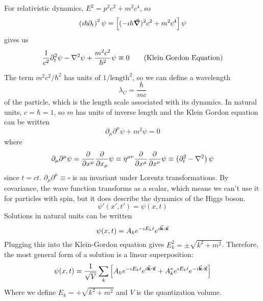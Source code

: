\documentclass[a4paper,twoside,master.tex]{subfiles}
\begin{document}
For relativistic dynamics, $ E^2 = p^2 c^2 + m^2 c^4 $, so
\begin{equation}
    \left( \imath \hbar \partial_t \right)^2 \psi = \left[ (- \imath \hbar \grad)^2 c^2 + m^2 c^4 \right] \psi
\end{equation}
gives us
\begin{equation}
    \frac{1}{c^2} \partial_t^2 \psi - \laplacian{\psi} + \frac{m^2 c^2}{\hbar^2} \psi \equiv 0 \tag{Klein Gordon Equation}
\end{equation}

The term $ m^2 c^2 / \hbar^2 $ has units of $ 1/ \text{length}^2 $, so we can define a wavelength
\begin{equation}
    \lambda_C = \frac{\hbar}{mc} \tag{Compton Wavelength}
\end{equation}
of the particle, which is the length scale associated with its dynamics. In natural units, $ c = \hbar = 1 $, so $ m $ has units of inverse length and the Klein Gordon equation can be written
\begin{equation}
    \partial_{\mu} \partial^{\mu} \psi + m^2 \psi = 0
\end{equation}
where
\begin{equation}
    \partial_{\mu} \partial^{\mu} \psi = \pdv{x^{\mu}} \pdv{x_{\mu}} \psi \equiv \eta^{\mu \nu} \pdv{x^{\mu}} \pdv{x^{\nu}} \psi \equiv \left( \partial_t^2 - \laplacian \right) \psi
\end{equation}
since $ t = ct $. $ \partial_{\mu} \partial^{\mu} \equiv \square $ is an invariant under Lorentz transformations. By covariance, the wave function transforms as a scalar, which means we can't use it for particles with spin, but it does describe the dynamics of the Higgs boson.
\begin{equation}
    \psi'(x',t') = \psi(x,t)
\end{equation}
Solutions in natural units can be written
\begin{equation}
    \psi(x,t) = A_k e^{- \imath E_k t} e^{\imath \va{k} \vdot \va{x}}
\end{equation}
Plugging this into the Klein-Gordon equation gives $ E_k^2 = \pm \sqrt{k^2 + m^2} $. Therefore, the most general form of a solution is a linear superposition:
\begin{equation}
    \psi(x,t) = \frac{1}{\sqrt{V}} \sum_k \left[ A_k e^{- \imath E_k t} e^{\imath \va{k} \vdot \va{x}} + A^*_k e^{\imath E_k t} e^{- \imath \va{k} \vdot \va{x}} \right]
\end{equation}
Where we define $ E_k = + \sqrt{k^2 + m^2} $ and $ V $ is the quantization volume.
\end{document}
